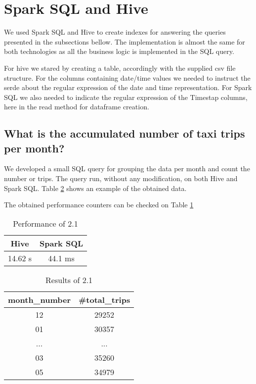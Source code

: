 \documentclass[conference,compsoc]{IEEEtran}
\begin{document}
\section{Spark SQL and Hive}
We used Spark SQL and Hive to create indexes for answering the queries presented in the subsections bellow. The implementation is almost the same for both technologies as all the business logic is implemented in the SQL query.

For hive we stared by creating a table, accordingly with the supplied csv file structure. For the columns containing date/time values we needed to instruct the serde about the regular expression of the date and time representation. For Spark SQL we also needed to indicate the regular expression of the Timestap columns, here in the read method for dataframe creation.

\subsection{What is the accumulated number of taxi trips per month?}
We developed a small SQL query for grouping the data per month and count the number or trips. The query run, without any modification, on both Hive and Spark SQL. Table \ref{output_2_1} shows an example of the obtained data.
\par

The obtained performance counters can be checked on Table \ref{perf_2_1}

\begin{table}[!t]
\renewcommand{\arraystretch}{1.3}
\caption{Performance of 2.1}
\label{perf_2_1}
\centering
\begin{tabular}{c|c}
\hline
\bfseries Hive & \bfseries Spark SQL \\
\hline\hline
14.62 s          & 44.1 ms    \\
\hline
\end{tabular}
\end{table}


\begin{table}[!t]
\renewcommand{\arraystretch}{1.3}
\caption{Results of 2.1}
\label{output_2_1}
\centering
\begin{tabular}{c||c}
\hline
\bfseries month\_number & \bfseries \#total\_trips\\
\hline\hline
12           & 29252       \\
01           & 30357       \\
...           & ...       \\
03           & 35260       \\
05           & 34979       \\
\hline
\end{tabular}
\end{table}
\end{document}
